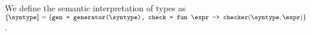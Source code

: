 \begin{definition}
  \label{def_typeAsVal}
  We define the semantic interpretation of types as $\llbracket \syntype \rrbracket = \{\texttt{gen = \mkgen{\syntype}, check = }\mkfunv{\expr}{\mkche{\syntype}{\expr}}\}$.
\end{definition}



